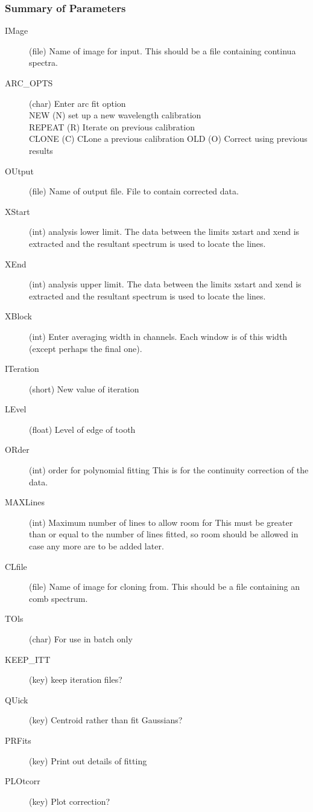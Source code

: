 \subsubsection{Summary of Parameters}
\begin{description}
\item[IMage] (file) Name of image for input. This should be a file
containing continua spectra.
\item[ARC\_OPTS] (char) Enter arc fit option\\
NEW    (N) set up a new wavelength calibration\\
REPEAT (R) Iterate on previous calibration\\
CLONE  (C) CLone a previous calibration
OLD    (O) Correct using previous results
\item[OUtput] (file) Name of output file. File to contain
corrected data.
\item[XStart] (int) analysis lower limit. The data between the
limits xstart and xend is extracted and the resultant spectrum is used
to locate the lines.
\item[XEnd] (int) analysis upper limit. The data between the
limits xstart and xend is extracted and the resultant spectrum is used
to locate the lines.
\item[XBlock] (int) Enter averaging width in channels. Each
window is of this width (except perhaps the final one).
\item[ITeration] (short) New value of iteration
\item[LEvel] (float) Level of edge of tooth
\item[ORder] (int) order for polynomial fitting This is for the
continuity correction of the data.
\item[MAXLines] (int) Maximum number of lines to allow room for
This must be greater than or equal to the number of lines fitted, so
room should be allowed in case any more are to be added later.
\item[CLfile] (file) Name of image for cloning from. This should
be a file containing an comb spectrum.
\item[TOls] (char) For use in batch only
\item[KEEP\_ITT] (key) keep iteration files?
\item[QUick] (key) Centroid rather than fit Gaussians?
\item[PRFits] (key) Print out details of fitting
\item[PLOtcorr] (key) Plot correction?
\end{description}

